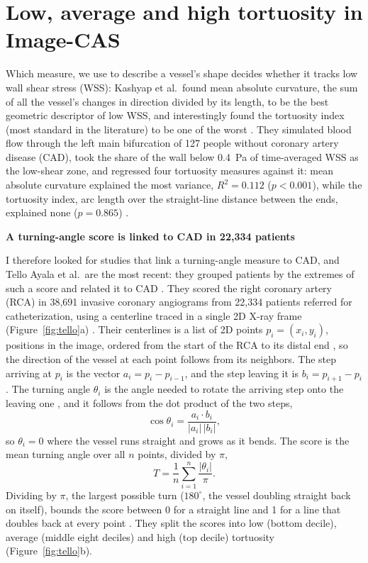 \section{Low, average and high tortuosity in Image-CAS}

\medskip


\noindent Which measure, we use to describe a vessel's shape decides whether it tracks low wall shear stress
(WSS): Kashyap et al.\ found mean absolute curvature, the sum of all the vessel's changes in
direction divided by its length, to be the best geometric descriptor of low WSS, and interestingly found the tortuosity index (most standard in the literature) to be one of the worst
\cite{kashyap2022tortuosity}.
They simulated blood flow through the left main bifurcation of 127 people without coronary artery
disease (CAD), took the share of the wall below 0.4~Pa of time-averaged WSS as the low-shear zone,
and regressed four tortuosity measures against it: mean absolute curvature explained the most
variance, $R^2 = 0.112$ ($p < 0.001$), while the tortuosity index, arc length over the
straight-line distance between the ends, explained none ($p = 0.865$) \cite{kashyap2022tortuosity}.


\medskip
\noindent \textbf{A turning-angle score is linked to CAD in 22,334 patients}


\noindent I therefore looked for studies that link a turning-angle measure to CAD, and Tello Ayala
et al.\ are the most recent: they grouped patients by the extremes of such a score and related it
to CAD \cite{tello2026tortuosity}.
They scored the right coronary artery (RCA) in 38,691 invasive coronary angiograms from 22,334
patients referred for catheterization, using a centerline traced in a single 2D X-ray frame
(Figure~\ref{fig:tello}a) \cite{tello2026tortuosity}.
Their centerlines is a list of 2D points $p_i = (x_i, y_i)$, positions in the image, ordered from the
start of the RCA to its distal end \cite{tello2026tortuosity}, so the direction of the vessel at each
point follows from its neighbors.
The step arriving at $p_i$ is the vector $a_i = p_i - p_{i-1}$, and the step leaving it is
$b_i = p_{i+1} - p_i$.
The turning angle $\theta_i$ is the angle needed to rotate the arriving step onto the leaving one
\cite{tello2026tortuosity}, and it follows from the dot product of the two steps,
\begin{equation}
  \cos\theta_i = \frac{a_i \cdot b_i}{\lvert a_i\rvert\,\lvert b_i\rvert},
  \label{eq:turn}
\end{equation}
so $\theta_i = 0$ where the vessel runs straight and grows as it bends.
The score is the mean turning angle over all $n$ points, divided by $\pi$,
\begin{equation}
  T = \frac{1}{n}\sum_{i=1}^{n} \frac{\lvert\theta_i\rvert}{\pi}.
  \label{eq:tello}
\end{equation}
Dividing by $\pi$, the largest possible turn ($180^\circ$, the vessel doubling straight back on itself),
bounds the score between 0 for a straight line and 1 for a line that doubles back at every point
\cite{tello2026tortuosity}.
They split the scores into low (bottom decile), average (middle eight deciles) and high (top
decile) tortuosity (Figure~\ref{fig:tello}b).

